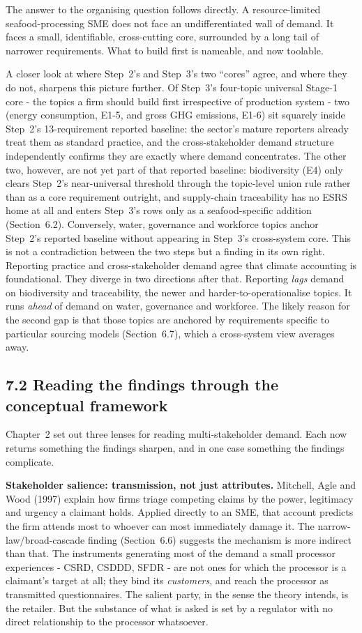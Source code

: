 \documentclass[
]{article}
\begin{document}
The answer to the organising question follows directly. A resource-limited
seafood-processing SME does not face an undifferentiated wall of demand. It faces a
small, identifiable, cross-cutting core, surrounded by a long tail of narrower
requirements. What to build first is nameable, and now toolable.

A closer look at where Step~2's and Step~3's two ``cores'' agree, and where
they do not, sharpens this picture further. Of Step~3's four-topic universal
Stage-1 core - the topics a firm should build first irrespective of
production system - two (energy consumption, E1-5, and gross GHG
emissions, E1-6) sit squarely inside Step~2's 13-requirement reported
baseline: the sector's mature reporters already treat them as standard
practice, and the cross-stakeholder demand structure independently confirms
they are exactly where demand concentrates. The other two, however, are not
yet part of that reported baseline: biodiversity (E4) only clears Step~2's
near-universal threshold through the topic-level union rule rather than as a
core requirement outright, and supply-chain traceability has no ESRS home at
all and enters Step~3's rows only as a seafood-specific addition
(Section~6.2). Conversely, water, governance and workforce topics anchor
Step~2's reported baseline without appearing in Step~3's cross-system
core. This is not a contradiction between the two steps but a finding in its
own right. Reporting practice and cross-stakeholder demand agree that climate
accounting is foundational. They diverge in two directions after that.
Reporting \emph{lags} demand on biodiversity and traceability, the newer and
harder-to-operationalise topics. It runs \emph{ahead} of demand on water,
governance and workforce. The likely reason for the second gap is that those
topics are anchored by requirements specific to particular sourcing models
(Section~6.7), which a cross-system view averages away.

\subsection{7.2 Reading the findings through the conceptual
framework}\label{discussion-theory}

Chapter~2 set out three lenses for reading multi-stakeholder demand. Each now
returns something the findings sharpen, and in one case something the findings
complicate.

\textbf{Stakeholder salience: transmission, not just attributes.} Mitchell, Agle
and Wood (1997) explain how firms triage competing claims by the power, legitimacy
and urgency a claimant holds. Applied directly to an SME, that account predicts
the firm attends most to whoever can most immediately damage it. The
narrow-law/broad-cascade finding (Section~6.6) suggests the mechanism is more
indirect than that. The instruments generating most of the demand a small
processor experiences - CSRD, CSDDD, SFDR - are not ones for which the processor
is a claimant's target at all; they bind its \emph{customers}, and reach the
processor as transmitted questionnaires. The salient party, in the sense the
theory intends, is the retailer. But the substance of what is asked is set by a
regulator with no direct relationship to the processor whatsoever.
\end{document}
